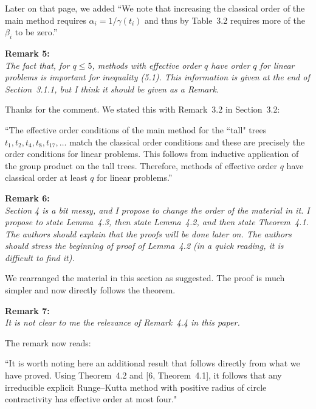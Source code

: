 \documentclass[12pt]{article}
\newcommand{\remark}[2]{\vspace{25pt} \noindent \textbf{Remark #1:\newline} \textit{#2}\vspace{15pt}}
\renewcommand{\newline}{\vspace{15pt}\\}
\newcommand{\david}[1]{\textcolor{red}{\\\textbf{D: \footnotesize #1}\\}}
\begin{document}
Later on that page, we added
``We note that increasing the classical order of the main method requires 
$\alpha_i = 1/\gamma(t_i)$ and
thus by Table~3.2 requires more of the $\beta_i$ to be zero.''

\pagebreak

\remark{5}{
The fact that, for $q \leq 5$, methods with effective order $q$ have order $q$ 
for linear problems is important for inequality (5.1). 
This information is given at the end of Section~3.1.1, but I think it should be given as a Remark.}

Thanks for the comment. We stated this with Remark~3.2 in Section~3.2:

``The effective order conditions of the main method for the ``tall" trees 
$t_1, t_2, t_4, t_8, t_{17}, \dots$ match the classical order conditions
and these are precisely the order conditions for linear problems.
This follows from inductive application of the group product 
on the tall trees. 
Therefore, methods of effective order $q$ have classical order at least $q$ 
for linear problems.''


\remark{6}{
Section 4 is a bit messy, and I propose to change the order of the material in it. 
I propose to state Lemma~4.3, then state Lemma~4.2, and then state Theorem~4.1. 
The authors should explain that the proofs will be done later on. 
The authors should stress the beginning of proof of Lemma~4.2 (in a quick reading, 
it is difficult to find it).}

We rearranged the material in this section as suggested.  The proof is
much simpler and now directly follows the theorem.


\remark{7}{
It is not clear to me the relevance of Remark~4.4 in this paper.}

The remark now reads:

``It is worth noting here an additional result that 
follows directly from what we have proved.
Using Theorem~4.2 and [6, Theorem~4.1], 
it follows that any irreducible explicit Runge--Kutta method with positive radius of
circle contractivity has effective order at most four."

\pagebreak
\end{document}
